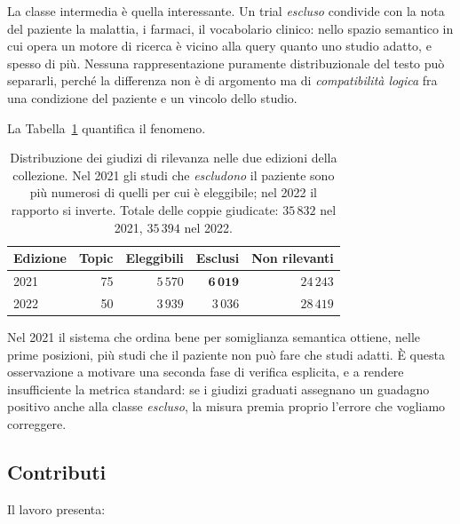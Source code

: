 \documentclass[pdflatex,sn-mathphys-num]{sn-jnl}
\theoremstyle{thmstyleone}
\theoremstyle{thmstyletwo}
\theoremstyle{thmstylethree}
\begin{document}
La classe intermedia è quella interessante. Un trial \emph{escluso} condivide con la nota del paziente la malattia, i farmaci, il vocabolario clinico: nello spazio semantico in cui opera un motore di ricerca è vicino alla query quanto uno studio adatto, e spesso di più. Nessuna rappresentazione puramente distribuzionale del testo può separarli, perché la differenza non è di argomento ma di \emph{compatibilità logica} fra una condizione del paziente e un vincolo dello studio.

La Tabella~\ref{tab:qrels} quantifica il fenomeno.

\begin{table}[H]
\centering
\begin{tabular}{lrrrr}
\toprule
Edizione & Topic & Eleggibili & Esclusi & Non rilevanti \\
\midrule
2021 & 75 & $5\,570$ & $\mathbf{6\,019}$ & $24\,243$ \\
2022 & 50 & $3\,939$ & $3\,036$ & $28\,419$ \\
\bottomrule
\end{tabular}
\caption{Distribuzione dei giudizi di rilevanza nelle due edizioni della collezione. Nel 2021 gli studi che \emph{escludono} il paziente sono più numerosi di quelli per cui è eleggibile; nel 2022 il rapporto si inverte. Totale delle coppie giudicate: $35\,832$ nel 2021, $35\,394$ nel 2022.}
\label{tab:qrels}
\end{table}

Nel 2021 il sistema che ordina bene per somiglianza semantica ottiene, nelle prime posizioni, più studi che il paziente non può fare che studi adatti. È questa osservazione a motivare una seconda fase di verifica esplicita, e a rendere insufficiente la metrica standard: se i giudizi graduati assegnano un guadagno positivo anche alla classe \emph{escluso}, la misura premia proprio l'errore che vogliamo correggere.

\subsection{Contributi}\label{sec:contributi}

Il lavoro presenta:
\end{document}

